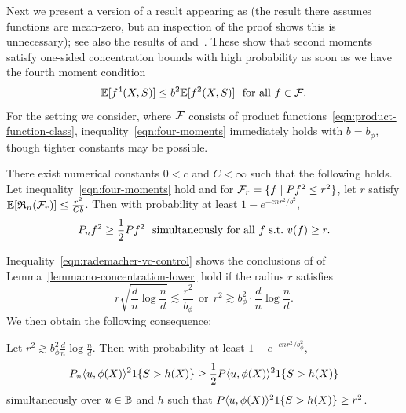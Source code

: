 \documentclass{article}
\newcommand{\radphi}{b_{\phi}}
\newcommand{\scorerv}{S}
\begin{document}
Next we present a version of a result appearing as \cite[Theorem
  14.12]{Wainwright19} (the result there assumes functions are mean-zero,
but an inspection of the proof shows this is unnecessary); see also the
results of \cite{Mendelson14} and~\cite[Proof of Proposition
  1]{DuchiRu18a}. These show that second moments satisfy one-sided
concentration bounds with high probability as soon as
we have the fourth moment condition
\begin{equation}
  \label{eqn:four-moments}
  \E[f^4(X, \scorerv)] \le b^2 \E[f^2(X, \scorerv)]
  ~~ \mbox{for~all~} f \in \mc{F}.
\end{equation}
For the setting we consider, where $\mathcal{F}$ consists
of product functions~\eqref{eqn:product-function-class},
inequality~\eqref{eqn:four-moments} immediately
holds with $b = \radphi$, though tighter constants may be possible.
\begin{lemma}
  \label{lemma:no-concentration-lower}
  There exist numerical constants $0 < c$ and $C < \infty$ such that
  the following holds. Let inequality~\eqref{eqn:four-moments} hold and
  for $\mathcal{F}_r = \{f \mid Pf^2 \le r^2\}$, let
  $r$ satisfy $\mathbb{E}[\mathfrak{R}_n(\mathcal{F}_r)] \le \frac{r^2}{C b}$. Then
  with probability at least $1 - e^{-c n r^2 / b^2}$,
  \begin{equation*}
    P_n f^2 \ge \frac{1}{2} P f^2
    ~~ \mbox{simultaneously~for~all~} f
    ~ \mbox{s.t.}~ v(f) \ge r.
  \end{equation*}
\end{lemma}

Inequality~\eqref{eqn:rademacher-vc-control} shows the conclusions of
of Lemma~\ref{lemma:no-concentration-lower} hold if the radius $r$
satisfies
\begin{equation*}
  r \sqrt{\frac{d}{n} \log \frac{n}{d}}
  \lesssim \frac{r^2}{\radphi}
  ~~ \mbox{or} ~~
  r^2 \gtrsim \radphi^2 \cdot \frac{d}{n} \log \frac{n}{d}.
\end{equation*}
We then obtain the following consequence:
\begin{lemma}
  \label{lemma:specialize-no-concentration}
  Let $r^2 \gtrsim \radphi^2 \frac{d}{n} \log \frac{n}{d}$.
  Then with probability at least $1 - e^{-c n r^2 / \radphi^2}$,
  \begin{equation*}
    P_n\<u, \phi(X)\>^2 \indic{\scorerv > h(X)}
    \ge \half P\<u, \phi(X)\>^2 \indic{\scorerv > h(X)}
  \end{equation*}
  simultaneously over $u \in \mathbb{B}$ and $h$ such that
  $P\<u, \phi(X)\>^2 \indic{\scorerv > h(X)} \ge r^2$.
\end{lemma}
\end{document}
